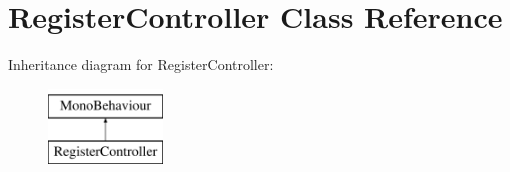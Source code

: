 \hypertarget{classRegisterController}{}\section{Register\+Controller Class Reference}
\label{classRegisterController}
Inheritance diagram for Register\+Controller\+:\begin{figure}[H]
\begin{center}
\leavevmode
\includegraphics[height=2.000000cm]{classRegisterController}
\end{center}
\end{figure}
